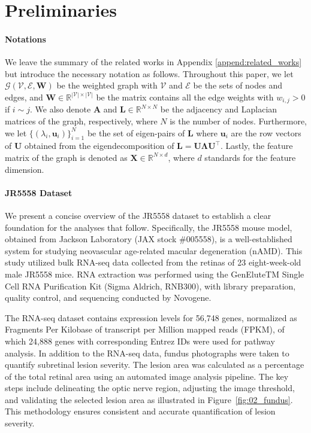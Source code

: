 \documentclass{article} %
\begin{document}
\section{Preliminaries}\label{sec:preliminaries}
\paragraph{Notations} We leave the summary of the related works in Appendix \ref{append:related_works} but introduce the necessary notation as follows. Throughout this paper, we let $\mathcal G (\mathcal V, \mathcal E, \mathbf W)$ be the weighted graph with $\mathcal V$ and $\mathcal E$ be the sets of nodes and edges, and $\mathbf W \in \mathbb R^{|\mathcal V| \times |\mathcal V|}$ be the matrix contains all the edge weights with $w_{i,j} > 0$ if $i \sim j$. We also denote $\mathbf A$ and $\mathbf L \in \mathbb R^{N\times N}$ be the adjacency and Laplacian matrices of the graph, respectively, where $N$ is the number of nodes. Furthermore, we let $\{ (\lambda_i, \mathbf u_i) \}_{i=1}^N$ be the set of eigen-pairs of ${\mathbf L}$ where $\mathbf u_i$ are the row vectors of $\mathbf U$ obtained from the eigendecomposition of $\mathbf L = \mathbf U \boldsymbol{\Lambda} \mathbf U^\top$. Lastly, the feature matrix of the graph is denoted as $\mathbf X \in \mathbb R^{N\times d}$, where $d$ standards for the feature dimension. 

\paragraph{JR5558 Dataset}
We present a concise overview of the JR5558 dataset to establish a clear foundation for the analyses that follow. Specifically, the JR5558 mouse model, obtained from Jackson Laboratory (JAX stock \#005558), is a well-established system for studying neovascular age-related macular degeneration (nAMD). This study utilized bulk RNA-seq data collected from the retinas of 23 eight-week-old male JR5558 mice. RNA extraction was performed using the GenEluteTM Single Cell RNA Purification Kit (Sigma Aldrich, RNB300), with library preparation, quality control, and sequencing conducted by Novogene. 

The RNA-seq dataset contains expression levels for 56,748 genes, normalized as Fragments Per Kilobase of transcript per Million mapped reads (FPKM), of which 24,888 genes with corresponding Entrez IDs were used for pathway analysis. In addition to the RNA-seq data, fundus photographs were taken to quantify subretinal lesion severity. The lesion area was calculated as a percentage of the total retinal area using an automated image analysis pipeline. The key steps include delineating the optic nerve region, adjusting the image threshold, and validating the selected lesion area as illustrated in Figure~\ref{fig:02_fundus}. This methodology ensures consistent and accurate quantification of lesion severity. 
\end{document}
